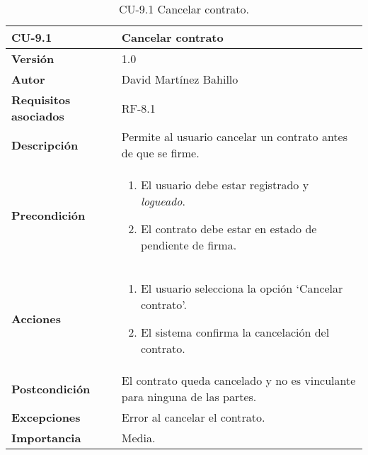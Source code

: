 \begin{table}[p]
	\centering
	\begin{tabularx}{\linewidth}{ p{} p{} }
		\toprule
		\textbf{CU-9.1}  & \textbf{Cancelar contrato}\\
		\midrule
		\textbf{Versión}              & 1.0    \\
		\textbf{Autor}                & David Martínez Bahillo \\
		\textbf{Requisitos asociados} & RF-8.1 \\
		\textbf{Descripción}          & Permite al usuario cancelar un contrato antes de que se firme. \\
		\textbf{Precondición}         &  
		\begin{enumerate}
			\item El usuario debe estar registrado y \textit{logueado}.
			\item El contrato debe estar en estado de pendiente de firma.
		\end{enumerate}\\
		\textbf{Acciones}             &
		\begin{enumerate}
			\item El usuario selecciona la opción `Cancelar contrato'.
			\item El sistema confirma la cancelación del contrato.
		\end{enumerate}\\
		\textbf{Postcondición}        & El contrato queda cancelado y no es vinculante para ninguna de las partes. \\
		\textbf{Excepciones}          & Error al cancelar el contrato. \\
		\textbf{Importancia}          & Media. \\
		\bottomrule
	\end{tabularx}
	\caption{CU-9.1 Cancelar contrato.}
\end{table}


